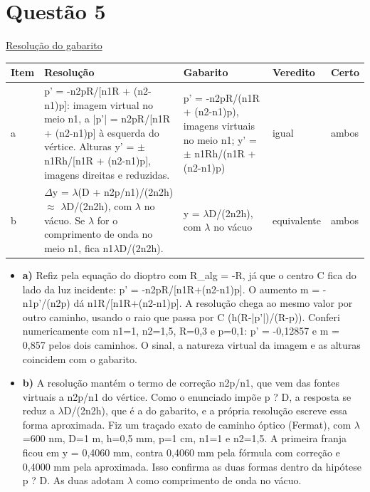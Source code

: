 \documentclass{article}%
\begin{document}
\section*{Questão 5}%
\href{https://poliedroresolve.sistemapoliedro.com.br/vestibulares/ita/2027/ita-2-fase-dia-3-22-10-2026-2-fase-dia-3/dissertativa-5-fisica-2-fase-dia-3-ita-2027}{Resolução do gabarito}\par\smallskip%
\begin{longtable}{@{}p{} p{} p{} p{} p{}@{}}\toprule Item & Resolução & Gabarito & Veredito & Certo \\ \midrule
a & p' = -n2pR/{[}n1R + (n2-n1)p{]}: imagem virtual no meio n1, a |p'| = n2pR/{[}n1R + (n2-n1)p{]} à esquerda do vértice. Alturas y' = $\pm$ n1Rh/{[}n1R + (n2-n1)p{]}, imagens direitas e reduzidas. & p' = -n2pR/(n1R + (n2-n1)p), imagens virtuais no meio n1; y' = $\pm$ n1Rh/(n1R + (n2-n1)p) & igual & ambos \\
b & $\Delta$y = $\lambda$(D + n2p/n1)/(2n2h) $\approx$ $\lambda$D/(2n2h), com $\lambda$ no vácuo. Se $\lambda$ for o comprimento de onda no meio n1, fica n1$\lambda$D/(2n2h). & y = $\lambda$D/(2n2h), com $\lambda$ no vácuo & equivalente & ambos \\
\bottomrule\end{longtable}%
\begin{itemize}%
\item%
\textbf{a)} Refiz pela equação do dioptro com R\_alg = -R, já que o centro C fica do lado da luz incidente: p' = -n2pR/{[}n1R+(n2-n1)p{]}. O aumento m = -n1p'/(n2p) dá n1R/{[}n1R+(n2-n1)p{]}. A resolução chega ao mesmo valor por outro caminho, usando o raio que passa por C (h(R-|p'|)/(R-p)). Conferi numericamente com n1=1, n2=1,5, R=0,3 e p=0,1: p' = -0,12857 e m = 0,857 pelos dois caminhos. O sinal, a natureza virtual da imagem e as alturas coincidem com o gabarito.%
\item%
\textbf{b)} A resolução mantém o termo de correção n2p/n1, que vem das fontes virtuais a n2p/n1 do vértice. Como o enunciado impõe p ? D, a resposta se reduz a $\lambda$D/(2n2h), que é a do gabarito, e a própria resolução escreve essa forma aproximada. Fiz um traçado exato de caminho óptico (Fermat), com $\lambda$=600 nm, D=1 m, h=0,5 mm, p=1 cm, n1=1 e n2=1,5. A primeira franja ficou em y = 0,4060 mm, contra 0,4060 mm pela fórmula com correção e 0,4000 mm pela aproximada. Isso confirma as duas formas dentro da hipótese p ? D. As duas adotam $\lambda$ como comprimento de onda no vácuo.%
\end{itemize}%
\end{document}
